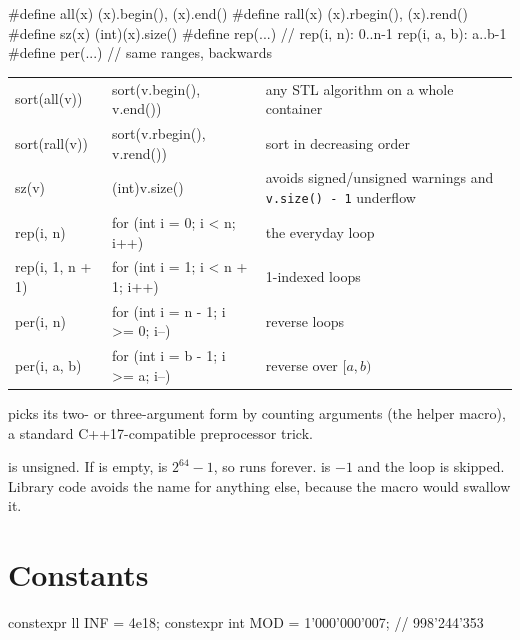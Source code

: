 \begin{code}
#define all(x) (x).begin(), (x).end()
#define rall(x) (x).rbegin(), (x).rend()
#define sz(x) (int)(x).size()
#define rep(...)   // rep(i, n): 0..n-1   rep(i, a, b): a..b-1
#define per(...)   // same ranges, backwards
\end{code}

\begin{center}
\begin{tabularx}{\linewidth}{>{\ttfamily}p{4.2cm}>{\ttfamily}p{5.8cm}L}
\toprule
{} &  &  \\
\midrule
sort(all(v)) & sort(v.begin(), v.end()) & any STL algorithm on a whole container \\
sort(rall(v)) & sort(v.rbegin(), v.rend()) & sort in decreasing order \\
sz(v) & (int)v.size() & avoids signed/unsigned warnings and \texttt{v.size() - 1} underflow \\
rep(i, n) & for (int i = 0; i < n; i++) & the everyday loop \\
rep(i, 1, n + 1) & for (int i = 1; i < n + 1; i++) & 1-indexed loops \\
per(i, n) & for (int i = n - 1; i >= 0; i--) & reverse loops \\
per(i, a, b) & for (int i = b - 1; i >= a; i--) & reverse over $[a, b)$ \\
\bottomrule
\end{tabularx}
\end{center}

 picks its two- or three-argument form by counting arguments (the  helper macro), a standard
C++17-compatible preprocessor trick.

\begin{pitfall}
 is unsigned. If  is empty,  is $2^{64}-1$, so
 runs forever.  is $-1$ and the loop is skipped.
Library code avoids the  name for anything else, because the macro would swallow it.
\end{pitfall}

\section{Constants}

\begin{code}
constexpr ll INF = 4e18;
constexpr int MOD = 1'000'000'007;  // 998'244'353
\end{code}

